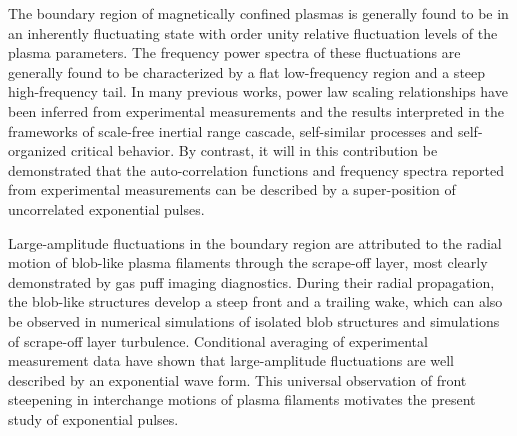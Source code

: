 \documentclass[aps,prb,12pt,a4paper,preprint,amsmath,amssymb,groupedaddress]{revtex4-1}
\begin{document}
The boundary region of magnetically confined plasmas is generally found to be in an inherently fluctuating state with order unity relative fluctuation levels of the plasma parameters.\cite{wootton,nedospasov,endler-jnm,dippolito,krasheninnikov,carreras-jnm,naulin-jnm,zweben,garcia-pfr,dmz} The frequency power spectra of these fluctuations are generally found to be characterized by a flat low-frequency region and a steep high-frequency tail.\cite{pedrosa-prl,carreras-php,rhodes,graves,antar-php1,antar-php2,dewhurst,xu-php,xu-ppcf,sattin,tanaka-nf,terry-jnm1,zweben-php-acm,terry-php,zweben-nf,zweben-php,cziegler-php} In many previous works, power law scaling relationships have been inferred from experimental measurements and the results interpreted in the frameworks of scale-free inertial range cascade, self-similar processes and self-organized critical behavior.\cite{pedrosa-prl,carreras-php,rhodes,graves,antar-php1,dewhurst,antar-php2,xu-php,sattin,tanaka-nf,xu-ppcf} By contrast, it will in this contribution be demonstrated that the auto-correlation functions and frequency spectra reported from experimental measurements can be described by a super-position of uncorrelated exponential pulses.


Large-amplitude fluctuations in the boundary region are attributed to the radial motion of blob-like plasma filaments through the scrape-off layer, most clearly demonstrated by gas puff imaging diagnostics.\cite{zweben-nf,maqueda,terry-php,zweben-php,terry-jnm2,terry-jnm1,zweben-php-acm,grulke-php,zweben-nf,agostini,cziegler-php,agostini-ppcf,kube-jnm,zweben-ppcf,fuchert-ppcf} During their radial propagation, the blob-like structures develop a steep front and a trailing wake, which can also be observed in numerical simulations of isolated blob structures\cite{bian-php,garcia-php-blob1,garcia-php-blob2,aydemir,kube-php-blob1,angus-php-blob1,kube-php-blob2,angus-php-blob2,madsen,gingell,kube-php-blob3,russell-php,wiesenberger,easy,halpern} and simulations of scrape-off layer turbulence.\cite{sarazin-jnm,garcia-prl-esel,bisai-php1,garcia-php-esel,garcia-ps-esel,fundamenski-nf,horacek-nf,russel-php,militello-ppcf,yan,bisai-php2} Conditional averaging of experimental measurement data have shown that large-amplitude fluctuations are well described by an exponential wave form.\cite{boedo-php1,rudakov-ppcf,boedo-php2,rudakov-nf,kirnev,antar-php3,garcia-ppcf-tcv1,garcia-jnm-tcv,garcia-nf-tcv,garcia-ppcf-tcv2,xu,horacek-asdex,militello,carralero-nf,boedo-php3,walkden,garcia-jnm,garcia-aps,garcia-nfl,theodorsen-ppcf,kube-ppcf,garcia-nme} This universal observation of front steepening in interchange motions of plasma filaments motivates the present study of exponential pulses.
\end{document}
